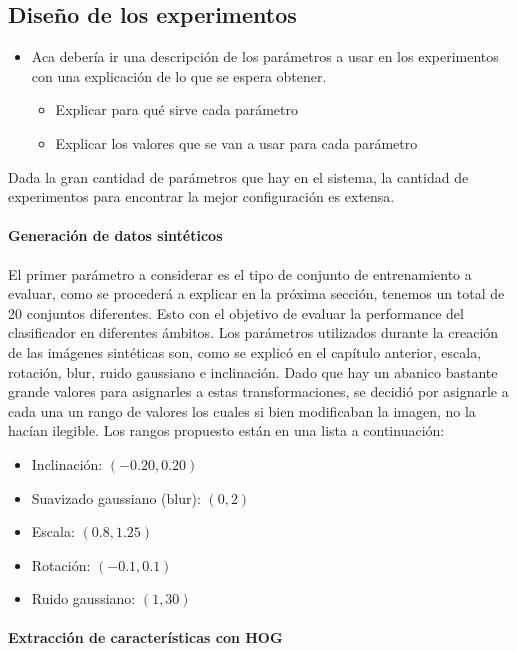 \subsection{Diseño de los experimentos}

	\begin{itemize}
		\item Aca debería ir una descripción de los parámetros a usar en los experimentos con una explicación de lo que se espera obtener.
		\begin{itemize}
			\item Explicar para qué sirve cada parámetro
			\item Explicar los valores que se van a usar para cada parámetro
		\end{itemize}
	\end{itemize}

	Dada la gran cantidad de parámetros que hay en el sistema, la cantidad de experimentos para encontrar la mejor configuración es extensa.

        \paragraph{Generación de datos sintéticos}

	El primer parámetro a considerar es el tipo de conjunto de entrenamiento a evaluar, como se procederá a explicar en la próxima sección, tenemos un total de 20 conjuntos diferentes. Esto con el objetivo de evaluar la performance del clasificador en diferentes ámbitos. Los parámetros utilizados durante la creación de las imágenes sintéticas son, como se explicó en el capítulo anterior, escala, rotación, blur, ruido gaussiano e inclinación. Dado que hay un abanico bastante grande valores para asignarles a estas transformaciones, se decidió por asignarle a cada una un rango de valores los cuales si bien modificaban la imagen, no la hacían ilegible. Los rangos propuesto están en una lista a continuación:
	\begin{itemize}
		\item Inclinación: $(-0.20, 0.20)$
		\item Suavizado gaussiano (blur): $(0, 2)$
		\item Escala: $(0.8, 1.25)$
		\item Rotación: $(-0.1, 0.1)$
		\item Ruido gaussiano: $(1, 30)$
	\end{itemize}

	\paragraph{Extracción de características con HOG}

